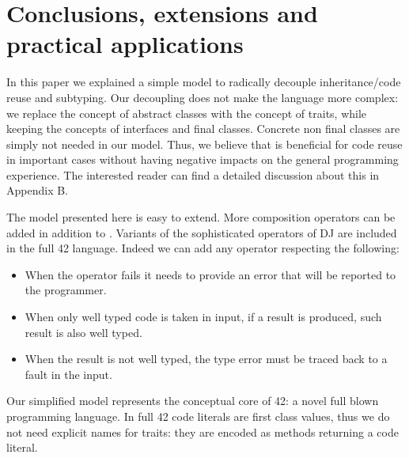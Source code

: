 \saveSpace\saveSpace
\section{Conclusions, extensions and practical applications}
\saveSpace
In this paper we explained a simple model to 
radically decouple inheritance/code reuse and subtyping.
Our decoupling does not
make the language more complex:
we replace the concept of abstract classes with
the concept of traits, while keeping the concepts of
interfaces and final classes.
Concrete non final classes are simply not needed in our model.
Thus, we believe that \name is beneficial for
code reuse in important cases 
without having negative impacts on the general programming experience.
The interested reader can find a detailed discussion about this in Appendix B.

The model presented here is easy to extend.
More composition operators can be added in addition to \use.
Variants of the sophisticated operators of DJ are
included in the full 42 language.
 Indeed we can add any operator respecting the following:

\begin{itemize}
\item When the operator fails it needs to provide an error that will be reported to the programmer.
\item When only well typed code is taken in input, if a result is produced,
 such result is also well typed.
\item When the result is not well typed,
the type error must be traced back to
a fault in the input.
 \end{itemize}
 

Our simplified model represents the conceptual core of  42: a novel full blown programming language.
In full 42 code literals are first class values, thus we
do not need explicit names
for traits: they are encoded as methods
 returning a code literal.

\begin{comment}
using the ideas presented in this paper to obtain reliable and understandable metaprogramming.
Formalization (in progress) for full 42 can be found at
\url{http://}\footnote{Omitted for anonymous review}. 
42 extends our model allowing
flattening to execute arbitrary computations.
In such model we do not need an explicit notion of traits: they are encoded as methods returning a code literal.
42 also has features less related to code composition, like
  a strong type system supporting aliasing mutability and circularity control,
   checked exceptions, and errors (unchecked exceptions) with strong-exception-safety.


42 do not have a finite set of composition operators; they can be
added using the built in support for native method calls. They can
be dynamically checked to verify that they are well behaved
according to our predicate, or they can be trusted to achieve
efficiency.
\end{comment}

